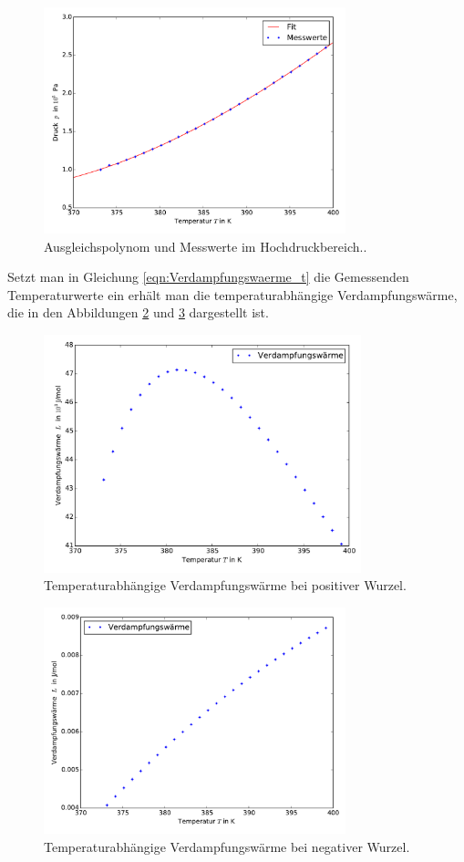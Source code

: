 \begin{figure}
  \centering
  \includegraphics[width=0.78\textwidth]{verdampfungwaerme2.pdf}
  \caption{Ausgleichspolynom und Messwerte im Hochdruckbereich..}
  \label{fig:fit2}
\end{figure}
Setzt man in Gleichung \eqref{eqn:Verdampfungswaerme_t} die Gemessenden Temperaturwerte ein erhält man
die temperaturabhängige Verdampfungswärme, die in den Abbildungen \ref{fig:fit3} und \ref{fig:fit4}
dargestellt ist.
\begin{figure}
  \centering
  \includegraphics[width=0.82\textwidth]{verdampfungwaerme3.pdf}
  \caption{Temperaturabhängige Verdampfungswärme bei positiver Wurzel.}
  \label{fig:fit3}
\end{figure}
\begin{figure}
  \centering
  \includegraphics[width=0.78\textwidth]{verdampfungwaerme4.pdf}
  \caption{Temperaturabhängige Verdampfungswärme bei negativer Wurzel.}
  \label{fig:fit4}
\end{figure}
